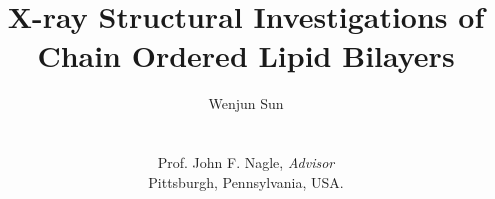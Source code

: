 %




\title{X-ray Structural Investigations of
Chain Ordered Lipid Bilayers}
\author{Wenjun Sun\\
~\\~\\
Prof. John F. Nagle, {\em Advisor} \\
Pittsburgh, Pennsylvania, USA.}
\beforepreface
\copyrightpage


\afterpreface
